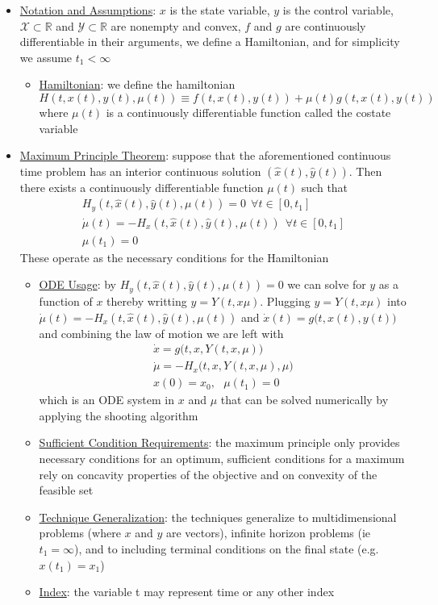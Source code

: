 \documentclass{article}
\begin{document}
\begin{itemize}
    \item \underline{Notation and Assumptions}: $x$ is the state variable, $y$ is the control variable, $\mathcal{X} \subset \mathbb{R}$  and $\mathcal{Y} \subset \mathbb{R}$ are nonempty and convex, $f$ and $g$ are continuously differentiable in their arguments, we define a Hamiltonian, and for simplicity we assume $t_{1} < \infty$
    \begin{itemize}
        \item  \underline{Hamiltonian}: we define the hamiltonian $$H(t,x(t),y(t),\mu(t)) \equiv f(t,x(t),y(t)) + \mu(t)g(t,x(t),y(t))$$ where $\mu(t)$ is a continuously differentiable function called the costate variable
    \end{itemize}
    \item  \underline{Maximum Principle Theorem}: suppose that the aforementioned continuous time problem has an interior continuous solution $(\widehat{x}(t), \widehat{y}(t))$. Then there exists a continuously differentiable function $\mu(t)$ such that
    \begin{gather*} H_{y}(t,\widehat{x}(t), \widehat{y}(t), \mu(t)) = 0 \ \ \forall t \in [0, t_{1}] \\ \dot{\mu}(t) = -H_{x}(t, \widehat{x}(t), \widehat{y}(t), \mu(t)) \ \ \forall t \in [0, t_{1}] \\ \mu(t_{1}) = 0
    \end{gather*}
    These operate as the necessary conditions for the Hamiltonian
    \begin{itemize}
        \item \underline{ODE Usage}: by $H_{y}(t,\widehat{x}(t), \widehat{y}(t), \mu(t)) = 0$ we can solve for $y$ as a function of $x$ thereby writting $y = Y(t, x \mu)$. Plugging $y = Y(t, x \mu)$ into $\dot{\mu}(t) = -H_{x}(t, \widehat{x}(t), \widehat{y}(t), \mu(t))$ and $ \dot{x}(t) = g\big(t, x(t), y(t)\big)$ and combining the law of motion we are left with
        \begin{gather*} \dot{x} = g\big(t, x, Y(t,x,\mu)\big) \\ \dot{\mu} = -H_{x}\big(t,x,Y(t,x,\mu),\mu \big) \\ x(0) = x_{0}, \ \ \ \mu(t_{1}) = 0 \end{gather*}
        which is an ODE system in $x$ and $\mu$ that can be solved numerically by applying the shooting algorithm
        \item \underline{Sufficient Condition Requirements}: the maximum principle only provides necessary conditions for an optimum, sufficient conditions for a maximum rely on concavity properties of the objective and on convexity of the feasible set
        \item \underline{Technique Generalization}: the techniques generalize to multidimensional problems (where $x$ and $y$ are vectors), infinite horizon problems (ie $t_{1} = \infty$), and to including terminal conditions on the final state (e.g. $x(t_{1}) = x_{1}$)
        \item \underline{Index}: the variable t may represent time or any other index
    \end{itemize}
\end{itemize}
\end{document}
